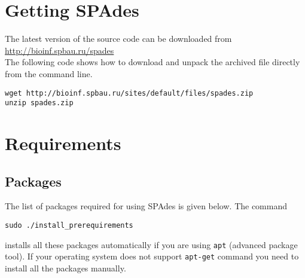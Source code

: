 \documentclass{article}
\def\spades{SPAdes}
\begin{document}
\section{Getting {\spades}}
The latest version of the source code can be downloaded from\\
\url{http://bioinf.spbau.ru/spades}\\
The following code shows how to download and unpack the archived file
directly from the command line.

\begin{lstlisting}
wget http://bioinf.spbau.ru/sites/default/files/spades.zip
unzip spades.zip
\end{lstlisting}

\section{Requirements}\label{section:requirements}
\subsection{Packages}\label{subsection:packages}
The list of packages required for using {\spades} is given below.
The command
\begin{lstlisting}
sudo ./install_prerequirements
\end{lstlisting}
installs all these packages automatically if you are using {\tt apt} (advanced package tool).
If your operating system does not support {\tt apt-get} command you
need to install all the packages manually. 
\end{document}
